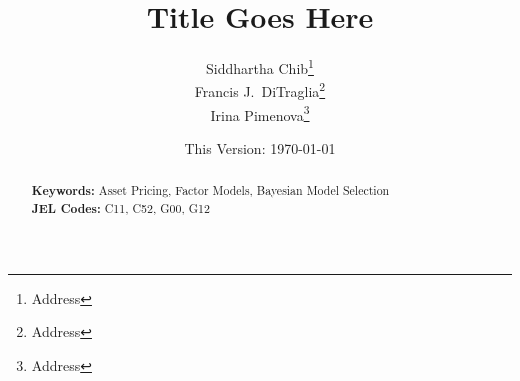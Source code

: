 \documentclass[12pt]{article}
\begin{document}
\title{Title Goes Here}

\author{Siddhartha Chib\footnote{Address} \\ 
Francis J.\ DiTraglia\footnote{Address} \\
Irina Pimenova\footnote{Address}}
\date{\small This Version: \today}
\maketitle 
\begin{abstract}
  \singlespacing
	

  	\bigskip
	\noindent\textbf{Keywords:} Asset Pricing, Factor Models, Bayesian Model Selection\\
	\medskip
  \noindent\textbf{JEL Codes:} C11, C52, G00, G12 
\end{abstract}









%
\end{document}

